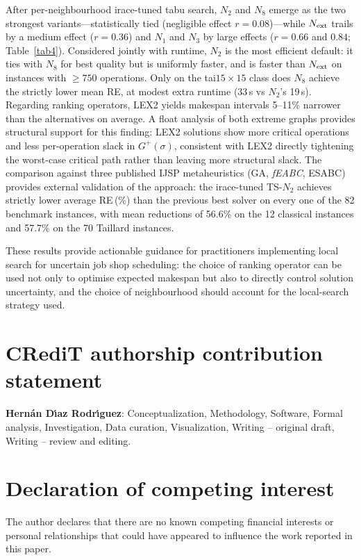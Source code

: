 \documentclass[preprint,12pt]{elsarticle}
\begin{document}
After per-neighbourhood irace-tuned tabu search, $N_2$ and $N_8$ emerge as the two strongest variants---statistically tied (negligible effect $r=0.08$)---while $N_{\rm ext}$ trails by a medium effect ($r=0.36$) and $N_1$ and $N_3$ by large effects ($r=0.66$ and $0.84$; Table~\ref{tab4}). Considered jointly with runtime, $N_2$ is the most efficient default: it ties with $N_8$ for best quality but is uniformly faster, and is faster than $N_{\rm ext}$ on instances with $\geq 750$ operations. Only on the tai$15{\times}15$ class does $N_8$ achieve the strictly lower mean RE, at modest extra runtime (33\,s vs $N_2$'s 19\,s). Regarding ranking operators, LEX2 yields makespan intervals 5--11\% narrower than the alternatives on average. A float analysis of both extreme graphs provides structural support for this finding: LEX2 solutions show more critical operations and less per-operation slack in $G^+(\sigma)$, consistent with LEX2 directly tightening the worst-case critical path rather than leaving more structural slack. The comparison against three published IJSP metaheuristics (GA, \emph{fEABC}, ESABC) provides external validation of the approach: the irace-tuned TS-$N_2$ achieves strictly lower average RE\,(\%) than the previous best solver on every one of the 82 benchmark instances, with mean reductions of 56.6\% on the 12 classical instances and 57.7\% on the 70 Taillard instances.

These results provide actionable guidance for practitioners implementing local search for uncertain job shop scheduling: the choice of ranking operator can be used not only to optimise expected makespan but also to directly control solution uncertainty, and the choice of neighbourhood should account for the local-search strategy used.


\section*{CRediT authorship contribution statement}

\textbf{Hern\'an D\'{\i}az Rodr\'{\i}guez}: Conceptualization, Methodology, Software, Formal analysis, Investigation, Data curation, Visualization, Writing -- original draft, Writing -- review and editing.


\section*{Declaration of competing interest}

The author declares that there are no known competing financial interests or personal relationships that could have appeared to influence the work reported in this paper.
\end{document}
